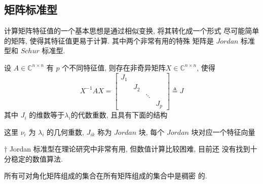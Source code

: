 \documentclass[12pt,a4paper]{article}
\begin{document}
\subsection{矩阵标准型}
计算矩阵特征值的一个基本思想是通过相似变换, 将其转化成一个形式
尽可能简单的矩阵, 使得其特征值更易于计算. 其中两个非常有用的特殊
矩阵是 $Jordan$ 标准型和 $Schur$ 标准型.

\begin{framed}
	\begin{theorem}
	设 $A ∈ \mathbb{C}^{n×n}$ 有 $p$ 个不同特征值, 则存在非奇异矩阵$ X ∈ \mathbb{C}^{n×n}$, 使得
		$$
		X^{-1} A X=\left[\begin{array}{cccc}{J_{1}} & {} & {} & {} \\ {} & {J_{2}} & {} \\ {} & {} & {\ddots} & {} \\ {} & {} & {} & {J_{p}}\end{array}\right] \triangleq J
		$$
	其中 $J_i$ 的维数等于$ λ_i $的代数重数, 且具有下面的结构


这里 $ν_i$ 为 $λ_i$ 的几何重数, $J_{ik}$ 称为 $Jordan$ 块, 每个 $Jordan$ 块对应一个特征向量	
	\end{theorem}
\end{framed}

\begin{framed}
	† Jordan 标准型在理论研究中非常有用, 但数值计算比较困难, 目前还
	没有找到十分稳定的数值算法.
\end{framed}

\begin{framed}
	\begin{corollary}
		所有可对角化矩阵组成的集合在所有矩阵组成的集合中是稠密
		的.
	\end{corollary}
\end{framed}
\end{document}
